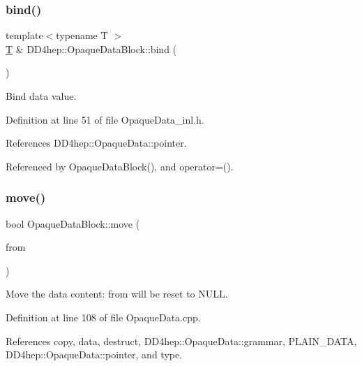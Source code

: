 \subsubsection{\texorpdfstring{bind()}{bind()}\hspace{0.1cm}{\footnotesize\ttfamily [2/2]}}
{\footnotesize\ttfamily template$<$typename T $>$ \\
\hyperlink{class_t}{T} \& D\+D4hep\+::\+Opaque\+Data\+Block\+::bind (\begin{DoxyParamCaption}{ }\end{DoxyParamCaption})}



Bind data value. 



Definition at line 51 of file Opaque\+Data\+\_\+inl.\+h.



References D\+D4hep\+::\+Opaque\+Data\+::pointer.



Referenced by Opaque\+Data\+Block(), and operator=().

\hypertarget{class_d_d4hep_1_1_opaque_data_block_a488c26189a1d06ed642a335be951af7b}{}\label{class_d_d4hep_1_1_opaque_data_block_a488c26189a1d06ed642a335be951af7b} 
\subsubsection{\texorpdfstring{move()}{move()}}
{\footnotesize\ttfamily bool Opaque\+Data\+Block\+::move (\begin{DoxyParamCaption}\item[{\hyperlink{class_d_d4hep_1_1_opaque_data_block}{Opaque\+Data\+Block} \&}]{from }\end{DoxyParamCaption})}



Move the data content\+: \textquotesingle{}from\textquotesingle{} will be reset to N\+U\+LL. 



Definition at line 108 of file Opaque\+Data.\+cpp.



References copy, data, destruct, D\+D4hep\+::\+Opaque\+Data\+::grammar, P\+L\+A\+I\+N\+\_\+\+D\+A\+TA, D\+D4hep\+::\+Opaque\+Data\+::pointer, and type.

\hypertarget{class_d_d4hep_1_1_opaque_data_block_a9fa632b86dc6203b7077c9f09cb23853}{}\label{class_d_d4hep_1_1_opaque_data_block_a9fa632b86dc6203b7077c9f09cb23853} 
